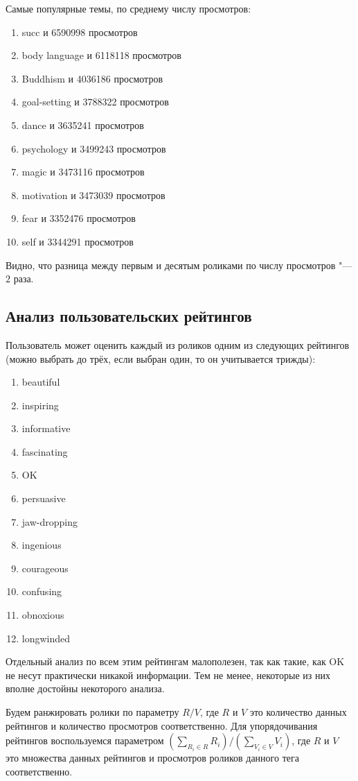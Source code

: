 \documentclass[12pt,a4paper]{scrartcl}
\begin{document}
Самые популярные темы, по среднему числу просмотров:
\begin{enumerate}
\item succ и 6590998 просмотров
\item body language и 6118118 просмотров
\item Buddhism и 4036186 просмотров
\item goal-setting и 3788322 просмотров
\item dance и 3635241 просмотров
\item psychology и 3499243 просмотров
\item magic и 3473116 просмотров
\item motivation и 3473039 просмотров
\item fear и 3352476 просмотров
\item self и 3344291 просмотров
\end{enumerate}

Видно, что разница между первым и десятым роликами по числу просмотров "--- $2$ раза.
\subsection{Анализ пользовательских рейтингов}
Пользователь может оценить каждый из роликов одним из следующих рейтингов (можно выбрать до трёх, если выбран один, то он учитывается трижды):
\begin{enumerate}
\item beautiful
\item inspiring
\item informative
\item fascinating
\item OK
\item persuasive
\item jaw-dropping
\item ingenious
\item courageous
\item confusing
\item obnoxious
\item longwinded
\end{enumerate}
Отдельный анализ по всем этим рейтингам малополезен, так как такие, как OK не несут практически никакой информации. Тем не менее, некоторые из них вполне достойны некоторого анализа.

Будем ранжировать ролики по параметру $R / V$, где $R$ и $V$ это количество данных рейтингов и количество просмотров соответственно. Для упорядочивания рейтингов воспользуемся параметром $\left( \sum_{R_i \in R} R_i \right) / \left( \sum_{V_i \in V} V_i \right)$, где $R$ и $V$ это множества данных рейтингов и просмотров роликов данного тега соответственно.
\end{document}
